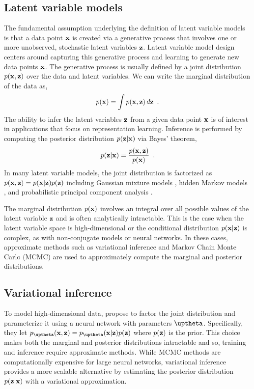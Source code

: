 \subsection{Latent variable models}
The fundamental assumption underlying the definition of latent variable models is that a data point ${\mathbf{x}}$ is created via a generative process that involves one or more unobserved, stochastic latent variables  ${\mathbf{z}}$. 
Latent variable model design centers around capturing this generative process and learning to generate new data points ${\mathbf{x}}$. The generative process is usually defined by a joint distribution $p({\mathbf{x}}, {\mathbf{z}})$ over the data and latent variables. 
We can write the marginal distribution of the data as,
%
\begin{equation} \label{eq:latent-variable-model-marginal-distribution}
    p(\xb) = \int p(\xb,\zb) \, d\zb \enspace .
\end{equation}
%
The ability to infer the latent variables ${\mathbf{z}}$ from a given data point ${\mathbf{x}}$ is of interest in applications that focus on representation learning. Inference is performed by computing the posterior distribution $p({\mathbf{z}}|{\mathbf{x}})$ via Bayes' theorem,
%
\begin{equation} \label{eq:latent-variable-model-posterior-distribution}
    p(\zb|\xb) = \frac{p(\xb,\zb)}{p(\xb)} \enspace .
\end{equation}
%
In many latent variable models, the joint distribution is factorized as $p({\mathbf{x}},{\mathbf{z}}) = p({\mathbf{x}}|{\mathbf{z}})p({\mathbf{z}})$ including Gaussian mixture models \parencite{dempster_maximum_1977}, hidden Markov models \parencite{rabiner_tutorial_1989}, and probabilistic principal component analysis \parencite{tipping_probabilistic_1999}. 

The marginal distribution $p({\mathbf{x}})$ involves an integral over all possible values of the latent variable ${\mathbf{z}}$ and is often analytically intractable. This is the case when the latent variable space is high-dimensional or the conditional distribution $p({\mathbf{x}}|{\mathbf{z}})$ is complex, as with non-conjugate models or neural networks. 
In these cases, approximate methods such as variational inference \parencite{jordan_introduction_1999} and Markov Chain Monte Carlo (MCMC) \parencite{mohamed_monte_2019} are used to approximately compute the marginal and posterior distributions. 


\subsection{Variational inference} \label{sec:variational-autoencoders}
To model high-dimensional data, \textcite{kingma_autoencoding_2014,rezende_stochastic_2014} propose to factor the joint distribution and parameterize it using a neural network with parameters $\thetab$. Specifically, they let $p_\thetab(\xb,\zb) = p_\thetab(\xb|\zb)p(\zb)$ where $p({\mathbf{z}})$ is the prior. 
This choice makes both the marginal and posterior distributions intractable and so, training and inference require approximate methods. 
While MCMC methods are computationally expensive for large neural networks, variational inference provides a more scalable alternative by estimating the posterior distribution $p({\mathbf{z}}|{\mathbf{x}})$ with a variational approximation. 


